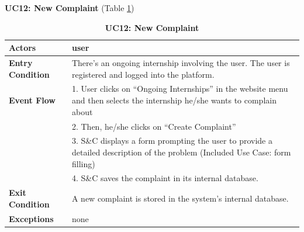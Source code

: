 \textbf{UC12: New Complaint }(Table \ref{tab:UC12})
\begin{table}[H]
\centering
\caption{\textbf{UC12: New Complaint}}
\label{tab:UC12}
\begin{tabularx}{\textwidth}{|X|X|}
\hline
\textbf{Actors}           & user                                                       \\ \hline
\textbf{Entry Condition}   & There’s an ongoing internship involving the user. The user is registered and logged into the platform. \\ \hline
\textbf{Event Flow}        & 1. User clicks on “Ongoing Internships” in the website menu and then selects the internship he/she wants to complain about \\
                           & 2. Then, he/she clicks on “Create Complaint” \\
                           & 3. S\&C displays a form prompting the user to provide a detailed description of the problem (Included Use Case: form filling) \\
                           & 4. S\&C saves the complaint in its internal database. \\ \hline
\textbf{Exit Condition}    & A new complaint is stored in the system’s internal database. \\ \hline
\textbf{Exceptions}        & none                                                      \\ \hline
\end{tabularx}
\end{table}


